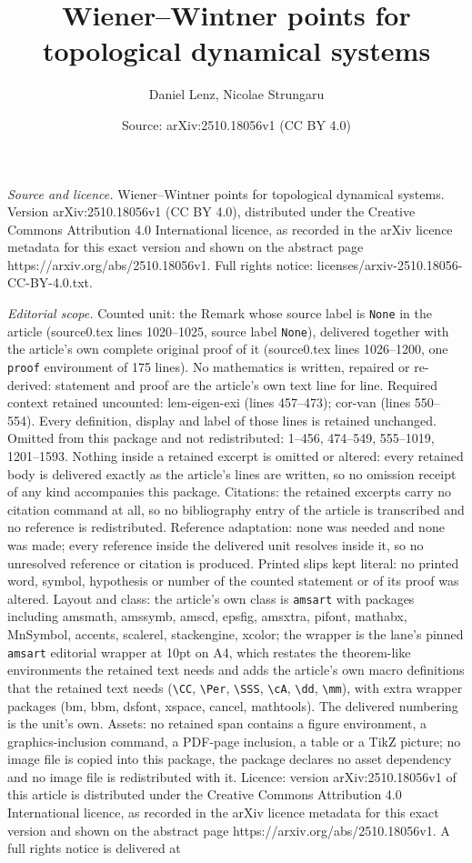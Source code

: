 \documentclass[10pt,a4paper]{amsart}
\title[Wiener--Wintner points for topological dynamical systems]{Wiener--Wintner points for topological dynamical systems}
\author{Daniel Lenz, Nicolae Strungaru}
\date{Source: arXiv:2510.18056v1 (CC BY 4.0)}
\begin{document}
\maketitle

\noindent\emph{Source and licence.} Wiener--Wintner points for topological dynamical systems. Version arXiv:2510.18056v1 (CC BY 4.0), distributed under the Creative Commons Attribution 4.0 International licence, as recorded in the arXiv licence metadata for this exact version and shown on the abstract page https://arxiv.org/abs/2510.18056v1. Full rights notice: licenses/arxiv-2510.18056-CC-BY-4.0.txt.\par\smallskip

\noindent\textit{Editorial scope.} Counted unit: the Remark whose source label is \texttt{None} in the article (source0.tex lines 1020--1025, source label \texttt{None}), delivered together with the article's own complete original proof of it (source0.tex lines 1026--1200, one \texttt{proof} environment of 175 lines). No mathematics is written, repaired or re-derived: statement and proof are the article's own text line for line. Required context retained uncounted: lem-eigen-exi (lines 457--473); cor-van (lines 550--554). Every definition, display and label of those lines is retained unchanged. Omitted from this package and not redistributed: 1--456, 474--549, 555--1019, 1201--1593. Nothing inside a retained excerpt is omitted or altered: every retained body is delivered exactly as the article's lines are written, so no omission receipt of any kind accompanies this package. Citations: the retained excerpts carry no citation command at all, so no bibliography entry of the article is transcribed and no reference is redistributed. Reference adaptation: none was needed and none was made; every reference inside the delivered unit resolves inside it, so no unresolved reference or citation is produced. Printed slips kept literal: no printed word, symbol, hypothesis or number of the counted statement or of its proof was altered. Layout and class: the article's own class is \texttt{amsart} with packages including amsmath, amssymb, amscd, epsfig, amsxtra, pifont, mathabx, MnSymbol, accents, scalerel, stackengine, xcolor; the wrapper is the lane's pinned \texttt{amsart} editorial wrapper at 10pt on A4, which restates the theorem-like environments the retained text needs and adds the article's own macro definitions that the retained text needs (\texttt{\textbackslash CC}, \texttt{\textbackslash Per}, \texttt{\textbackslash SSS}, \texttt{\textbackslash cA}, \texttt{\textbackslash dd}, \texttt{\textbackslash mm}), with extra wrapper packages (bm, bbm, dsfont, xspace, cancel, mathtools). The delivered numbering is the unit's own. Assets: no retained span contains a figure environment, a graphics-inclusion command, a PDF-page inclusion, a table or a TikZ picture; no image file is copied into this package, the package declares no asset dependency and no image file is redistributed with it. Licence: version arXiv:2510.18056v1 of this article is distributed under the Creative Commons Attribution 4.0 International licence, as recorded in the arXiv licence metadata for this exact version and shown on the abstract page https://arxiv.org/abs/2510.18056v1. A full rights notice is delivered at 
\end{document}
